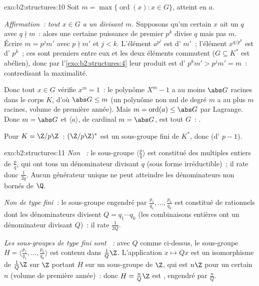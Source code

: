 \begin{solution}{exo:b2:structures:10}
Soit $m = \max\{\operatorname{ord}(x) : x \in G\}$, atteint en $a$.

\emph{Affirmation~: tout $x \in G$ a un  divisant $m$.} Supposons
qu'un certain $x$ ait un  $q$ avec $q \nmid m$~: alors une
certaine puissance de premier $p^k$ divise $q$ mais pas $m$. Écrire $m
= p^j m'$ avec $p \nmid m'$ et $j < k$. L'élément $a^{p^j}$ est
d' $m'$~; l'élément $x^{q/p^k}$ est d' $p^k$~; ces 
sont premiers entre eux et les deux éléments commutent ($G \subseteq
K^*$ est abélien), donc par l'\cref{exo:b2:structures:4} leur produit
est d' $p^k m' > p^j m' = m$~: contredisant la maximalité.

Donc tout $x \in G$ vérifie $x^m = 1$~: le polynôme $X^m - 1$ a au
moins $\abs G$ racines dans le corps $K$, d'où $\abs G \leq m$
(un polynôme non nul de degré $m$ a au plus $m$ racines, volume de
première année). Mais $m = \operatorname{ord}(a) \leq \abs G$ par
Lagrange. Donc $m = \abs G$ et $\langle a \rangle$, de cardinal $m =
\abs G$, est tout $G$~: .

Pour $K = \Z/p\Z$~: $(\Z/p\Z)^*$ est un sous-groupe fini de $K^*$,
donc  (d' $p - 1$).
\end{solution}

\begin{solution}{exo:b2:structures:11}
\emph{Non ~:} le sous-groupe $\langle \frac pq\rangle$ est
constitué des multiples entiers de $\frac pq$, qui ont tous un
dénominateur divisant $q$ (sous forme irréductible)~; il rate donc
$\frac{1}{2q}$. Aucun générateur unique ne peut atteindre les
dénominateurs non bornés de $\Q$.

\emph{Non de type fini~:} le sous-groupe engendré par
$\frac{p_1}{q_1}, \dots, \frac{p_k}{q_k}$ est constitué de rationnels
dont les dénominateurs divisent $Q = q_1 \cdots q_k$ (les combinaisons
entières ont un dénominateur divisant $Q$)~: il rate $\frac{1}{2Q}$.

\emph{Les sous-groupes de type fini sont ~:} avec $Q$ comme
ci-dessus, le sous-groupe $H = \langle \frac{p_1}{q_1}, \dots,
\frac{p_k}{q_k}\rangle$ est contenu dans $\frac{1}{Q}\Z$. L'application
$x \mapsto Qx$ est un isomorphisme de $\frac1Q\Z$ sur $\Z$ portant
$H$ sur un sous-groupe de $\Z$, qui est $n\Z$ pour un certain $n$
(volume de première année)~: donc $H = \frac{n}{Q}\Z$ est ,
engendré par $\frac nQ$.
\end{solution}

